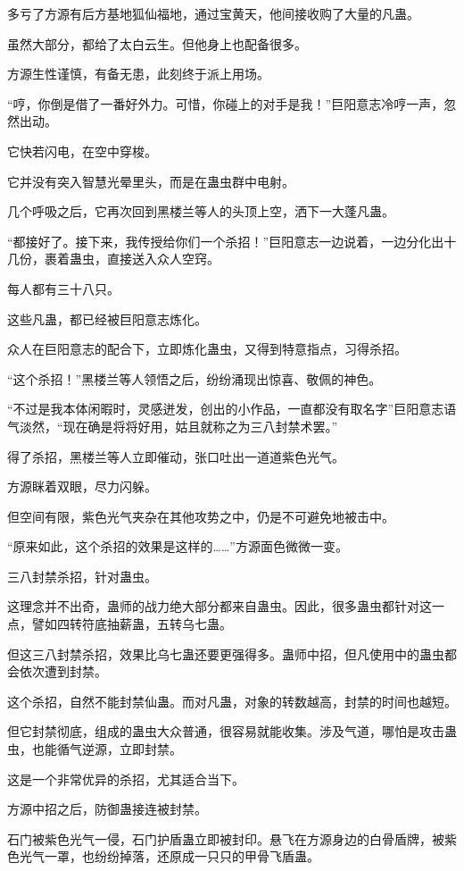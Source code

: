 \begin{this_body}
多亏了方源有后方基地狐仙福地，通过宝黄天，他间接收购了大量的凡蛊。

虽然大部分，都给了太白云生。但他身上也配备很多。

方源生性谨慎，有备无患，此刻终于派上用场。

“哼，你倒是借了一番好外力。可惜，你碰上的对手是我！”巨阳意志冷哼一声，忽然出动。

它快若闪电，在空中穿梭。

它并没有突入智慧光晕里头，而是在蛊虫群中电射。

几个呼吸之后，它再次回到黑楼兰等人的头顶上空，洒下一大蓬凡蛊。

“都接好了。接下来，我传授给你们一个杀招！”巨阳意志一边说着，一边分化出十几份，裹着蛊虫，直接送入众人空窍。

每人都有三十八只。

这些凡蛊，都已经被巨阳意志炼化。

众人在巨阳意志的配合下，立即炼化蛊虫，又得到特意指点，习得杀招。

“这个杀招！”黑楼兰等人领悟之后，纷纷涌现出惊喜、敬佩的神色。

“不过是我本体闲暇时，灵感迸发，创出的小作品，一直都没有取名字”巨阳意志语气淡然，“现在确是将将好用，姑且就称之为三八封禁术罢。”

得了杀招，黑楼兰等人立即催动，张口吐出一道道紫色光气。

方源眯着双眼，尽力闪躲。

但空间有限，紫色光气夹杂在其他攻势之中，仍是不可避免地被击中。

“原来如此，这个杀招的效果是这样的……”方源面色微微一变。

三八封禁杀招，针对蛊虫。

这理念并不出奇，蛊师的战力绝大部分都来自蛊虫。因此，很多蛊虫都针对这一点，譬如四转符底抽薪蛊，五转乌七蛊。

但这三八封禁杀招，效果比乌七蛊还要更强得多。蛊师中招，但凡使用中的蛊虫都会依次遭到封禁。

这个杀招，自然不能封禁仙蛊。而对凡蛊，对象的转数越高，封禁的时间也越短。

但它封禁彻底，组成的蛊虫大众普通，很容易就能收集。涉及气道，哪怕是攻击蛊虫，也能循气逆源，立即封禁。

这是一个非常优异的杀招，尤其适合当下。

方源中招之后，防御蛊接连被封禁。

石门被紫色光气一侵，石门护盾蛊立即被封印。悬飞在方源身边的白骨盾牌，被紫色光气一罩，也纷纷掉落，还原成一只只的甲骨飞盾蛊。


\end{this_body}
